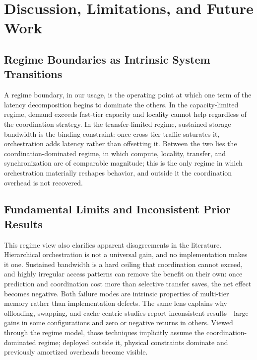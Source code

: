 \section{Discussion, Limitations, and Future Work}\label{sec:discussion}

\subsection{Regime Boundaries as Intrinsic System Transitions}
A regime boundary, in our usage, is the operating point at which one term of the latency decomposition begins to dominate the others.
In the capacity-limited regime, demand exceeds fast-tier capacity and locality cannot help regardless of the coordination strategy.
In the transfer-limited regime, sustained storage bandwidth is the binding constraint: once cross-tier traffic saturates it, orchestration adds latency rather than offsetting it.
Between the two lies the coordination-dominated regime, in which compute, locality, transfer, and synchronization are of comparable magnitude; this is the only regime in which orchestration materially reshapes behavior, and outside it the coordination overhead is not recovered.

\subsection{Fundamental Limits and Inconsistent Prior Results}
This regime view also clarifies apparent disagreements in the literature.
Hierarchical orchestration is not a universal gain, and no implementation makes it one.
Sustained bandwidth is a hard ceiling that coordination cannot exceed, and highly irregular access patterns can remove the benefit on their own: once prediction and coordination cost more than selective transfer saves, the net effect becomes negative. Both failure modes are intrinsic properties of multi-tier memory rather than implementation defects.
The same lens explains why offloading, swapping, and cache-centric studies report inconsistent results---large gains in some configurations and zero or negative returns in others. Viewed through the regime model, those techniques implicitly assume the coordination-dominated regime; deployed outside it, physical constraints dominate and previously amortized overheads become visible.

